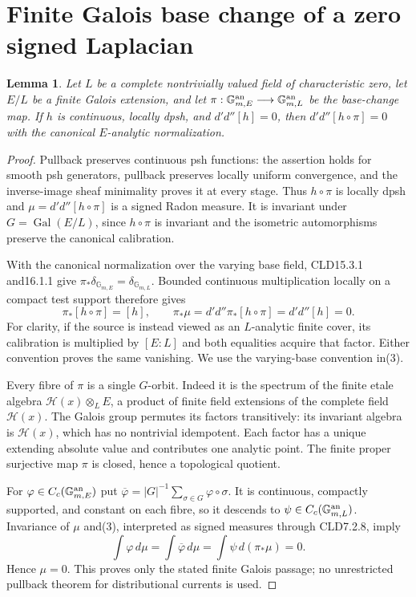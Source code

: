 \documentclass[11pt]{article}
\newtheorem{lemma}[theorem]{Lemma}
\newcommand{\DD}{d'd''}
\begin{document}
\section{Finite Galois base change of a zero signed Laplacian}
\begin{lemma}\label{finitegalois}
Let $L$ be a complete nontrivially valued field of characteristic zero,
let $E/L$ be a finite Galois extension, and let
$\pi:\mathbb G_{m,E}^{\rm an}\longrightarrow\mathbb G_{m,L}^{\rm an}$
be the base-change map. If $h$ is continuous, locally dpsh, and
$\DD[h]=0$, then $\DD[h\circ\pi]=0$ with the canonical
$E$-analytic normalization.
\end{lemma}
\begin{proof}
Pullback preserves continuous psh functions: the assertion holds for
smooth psh generators, pullback preserves locally uniform convergence,
and the inverse-image sheaf minimality proves it at every stage.
Thus $h\circ\pi$ is locally dpsh and
$\mu=\DD[h\circ\pi]$ is a signed Radon measure. It is invariant under
$G=\operatorname{Gal}(E/L)$, since $h\circ\pi$ is invariant and
the isometric automorphisms preserve the canonical calibration.

With the canonical normalization over the varying base field,
CLD15.3.1 and16.1.1 give $\pi_*\delta_{\mathbb G_{m,E}}
=\delta_{\mathbb G_{m,L}}$. Bounded continuous multiplication
locally on a compact test support therefore gives
\[
 \pi_*[h\circ\pi]=[h],\qquad
 \pi_*\mu=\DD\pi_*[h\circ\pi]=\DD[h]=0.        \tag{3}
\]
For clarity, if the source is instead viewed as an $L$-analytic
finite cover, its calibration is multiplied by $[E:L]$ and both
equalities acquire that factor. Either convention proves the same
vanishing. We use the varying-base convention in(3).

Every fibre of $\pi$ is a single $G$-orbit. Indeed it is the spectrum
of the finite etale algebra $\mathscr H(x)\otimes_L E$, a product
of finite field extensions of the complete field $\mathscr H(x)$.
The Galois group permutes its factors transitively: its invariant
algebra is $\mathscr H(x)$, which has no nontrivial idempotent.
Each factor has a unique extending absolute value and contributes
one analytic point. The finite proper surjective map $\pi$ is closed,
hence a topological quotient.

For $\varphi\in C_c(\mathbb G_{m,E}^{\rm an})$ put
$\overline\varphi=|G|^{-1}\sum_{\sigma\in G}\varphi\circ\sigma$.
It is continuous, compactly supported, and constant on each fibre,
so it descends to $\psi\in C_c(\mathbb G_{m,L}^{\rm an})$.
Invariance of $\mu$ and(3), interpreted as signed measures through
CLD7.2.8, imply
\[
 \int\varphi\,d\mu=\int\overline\varphi\,d\mu
                      =\int\psi\,d(\pi_*\mu)=0.
\]
Hence $\mu=0$. This proves only the stated finite Galois passage;
no unrestricted pullback theorem for distributional currents is used.
\end{proof}
\end{document}
